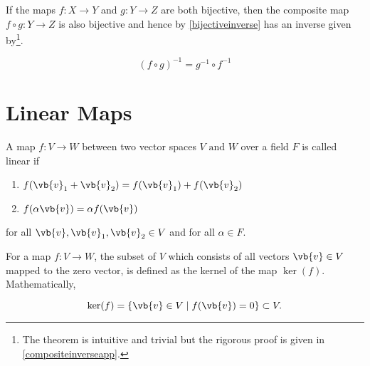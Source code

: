\documentclass[a4paper,12pt]{report}
\begin{document}
\begin{theorem}  \label{compositeinversetheo} 
If the maps \(f: X \rightarrow Y\) and \(g: Y \rightarrow Z\) are both bijective, then the composite map \(f \circ g: Y \rightarrow Z\) is also bijective and hence by \cref{bijectiveinverse} has an inverse given by\footnote{The theorem is intuitive and trivial but the rigorous proof is given in \cref{compositeinverseapp}.}.

\begin{equation} \label{compositeinverseeq} 
    (f \circ g)^{-1} = g^{-1} \circ f^{-1} 
\end{equation}

\end{theorem}


\section{Linear Maps}

\begin{definition} \label{linearmap} 
A map \(f:V \rightarrow W\) between two vector spaces \(V \text { and }  W\) over a field \(F\) is called linear if 

\begin{enumerate}[label=(E\arabic*)]
    \item \(f(\vb{v} _{1} + \vb{v} _{2}  ) = f(\vb{v} _{1} ) + f(\vb{v} _{2} )\)
    \item \(f(\alpha \vb{v} ) = \alpha f(\vb{v} )\)  
\end{enumerate}

for all \(\vb{v} ,\vb{v} _{1}, \vb{v} _{2}\in V  \) and for all \(\alpha \in  F\). 

\end{definition}

\begin{definition}
For a map \(f: V \rightarrow W\), the subset of \(V\) which consists of all vectors \(\vb{v} \in V\) mapped to the zero vector, is defined as the kernel of the map \(\ker (f)\). Mathematically,
    
\begin{equation}
    \ker (f) = \left\{ \vb{v} \in V \mid f(\vb{v} )=0 \right\} \subset V.
\end{equation}
    
\end{definition}
\end{document}
